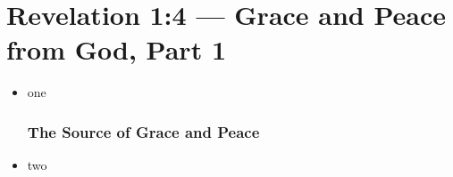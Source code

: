 \documentclass[12pt]{article}
\newcommand{\BI}{\begin{itemize}}
\newcommand{\EI}{\end{itemize}}
\newcommand{\I}{\item}
\begin{document}
\part*{Revelation 1:4 --- Grace and Peace from God, Part 1}
\tableofcontents
\BI
\section*{The Need for Grace and Peace}
\I one

\section*{The Source of Grace and Peace}
\I two
\EI
\end{document}
